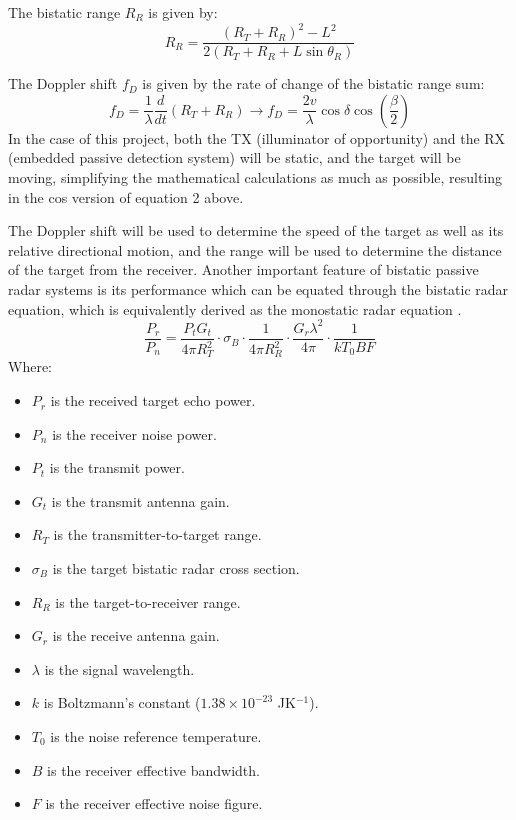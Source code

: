 \par \vspace{0.5cm} 
\noindent The bistatic range \( R_R \) is given by:
\begin{equation}
R_R = \frac{(R_T + R_R)^2 - L^2}{2(R_T + R_R + L \sin \theta_R)}
\end{equation}

\noindent The Doppler shift \( f_D \) is given by the rate of change of the bistatic range sum:
\begin{equation}
f_D = \frac{1}{\lambda} \frac{d}{dt}(R_T + R_R) \xrightarrow{} f_D = \frac{2v}{\lambda} \cos \delta \cos(\frac{\beta}{2})
\end{equation}
In the case of this project, both the TX (illuminator of opportunity) and the RX (embedded passive detection system) will be static, and the target will be moving, simplifying the mathematical calculations as much as possible, resulting in the cos version of equation 2 above. 

\par
The Doppler shift will be used to determine the speed of the target as well as its relative directional motion, and the range will be used to determine the distance of the target from the receiver. Another important feature of bistatic passive radar systems is its performance which can be equated through the bistatic radar equation, which is equivalently derived as the monostatic radar equation \cite{FundamentalsPassiveRadar}. 
\vspace{0.5cm} 
\begin{equation}
    \frac{P_r}{P_n} = \frac{P_t G_t}{4\pi R_T^2} \cdot \sigma_B \cdot \frac{1}{4\pi R_R^2} \cdot \frac{G_r \lambda^2}{4\pi} \cdot \frac{1}{k T_0 B F}
\end{equation}
Where:
\begin{multicols}{2}
    \begin{itemize}
    \item \( P_r \) is the received target echo power.
    \item \( P_n \) is the receiver noise power.
    \item \( P_t \) is the transmit power.
    \item \( G_t \) is the transmit antenna gain.
    \item \( R_T \) is the transmitter-to-target range.
    \item \( \sigma_B \) is the target bistatic radar cross section.
    \item \( R_R \) is the target-to-receiver range.
    \item \( G_r \) is the receive antenna gain.
    \item \( \lambda \) is the signal wavelength.
    \item \( k \) is Boltzmann’s constant (\( 1.38 \times 10^{-23} \) JK\(^{-1}\)).
    \item \( T_0 \) is the noise reference temperature.
    \item \( B \) is the receiver effective bandwidth.
    \item \( F \) is the receiver effective noise figure.
    \end{itemize}
\end{multicols}

